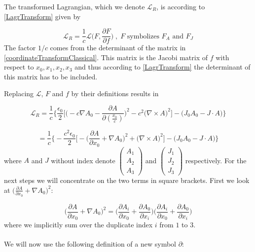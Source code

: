 \documentclass{article}
\begin{document}
The transformed Lagrangian, which we denote $\mathcal{L}_R$, is according to \ref{LagrTransform} given by

\begin{equation}
    \mathcal{L}_R = \frac{1}{c} \mathcal{L} \bigg(F, \frac{\partial F}{\partial f} \bigg) \;,\; \text{$F$ symbolizes $F_A$ and $F_J$}
\end{equation}
The factor $1/c$ comes from the determinant of the matrix in \ref{coordinateTransformClassical}.
This matrix is the Jacobi matrix of $f$ with respect to $x_0,x_1,x_2,x_3$ and thus according to \ref{LagrTransform} the determinant of this matrix has to be included.

Replacing $\mathcal{L}$, $F$ and $f$ by their definitions results in

\begin{equation}
    \mathcal{L}_R = \frac{1}{c} \bigg\{ \frac{\epsilon_0}{2} \bigg[ \bigg(-c \nabla A_0 - \frac{\partial A}{\partial (\frac{x_0}{c})}\bigg)^2 - c^2 \bigg(\nabla \times A\bigg)^2 \bigg]
    - \big( J_0 A_0 - J \cdot A \big) \bigg\}
\end{equation}

\begin{equation} \label{maxwellHalfRelatifistic}
    = \frac{1}{c} \bigg\{ - \frac{c^2 \epsilon_0}{2} \bigg[ -\bigg(\frac{\partial A}{\partial x_0} + \nabla A_0 \bigg)^2 + \bigg(\nabla \times A\bigg)^2 \bigg]
    - \big( J_0 A_0 - J \cdot A \big) \bigg\}
\end{equation}
where $A$ and $J$ without index denote  $\left( \begin{array}{c} A_1 \\ A_2 \\ A_3 \end{array} \right)$ and $\left( \begin{array}{c} J_1 \\ J_2 \\ J_3 \end{array} \right)$ respectively.
For the next steps we will concentrate on the two terms in square brackets.
First we look at $\big(\frac{\partial A}{\partial x_0} + \nabla A_0 \big)^2$:

\begin{equation} \label{A0_Equation}
    \bigg(\frac{\partial A}{\partial x_0} + \nabla A_0 \bigg)^2
      = \bigg(\frac{\partial A_i}{\partial x_0} + \frac{\partial A_0}{\partial x_i} \bigg) \bigg(\frac{\partial A_i}{\partial x_0} + \frac{\partial A_0}{\partial x_i} \bigg)
\end{equation}
where we implicitly sum over the duplicate index $i$ from $1$ to $3$.
\\
\\
\noindent We will now use the following definition of a new symbol $\partial$:
\end{document}

